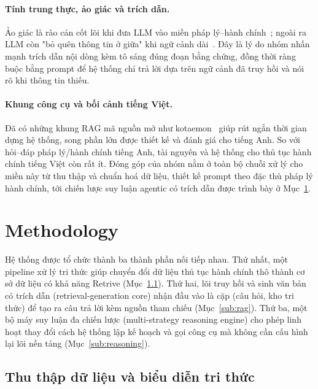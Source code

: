 \documentclass[11pt]{article}
\begin{document}
\paragraph{Tính trung thực, ảo giác và trích dẫn.}
Ảo giác là rào cản cốt lõi khi đưa LLM vào miền pháp lý--hành chính~\citep{ji2023hallucination};
ngoài ra LLM còn "bỏ quên thông tin ở giữa" khi ngữ cảnh dài~\citep{liu2024lostmiddle}. Đây
là lý do nhóm nhấn mạnh trích dẫn nội dòng kèm tô sáng đúng đoạn bằng chứng, đồng thời
ràng buộc bằng prompt để hệ thống chỉ trả lời dựa trên ngữ cảnh đã truy hồi và nói rõ khi
thông tin thiếu.

\paragraph{Khung công cụ và bối cảnh tiếng Việt.}
Đã có những khung RAG mã nguồn mở như kotaemon~\citep{kotaemon2024} giúp rút ngắn thời gian
dựng hệ thống, song phần lớn được thiết kế và đánh giá cho tiếng Anh. So với hỏi--đáp pháp
lý/hành chính tiếng Anh, tài nguyên và hệ thống cho thủ tục hành chính tiếng Việt còn
rất ít. Đóng góp của nhóm nằm ở toàn bộ chuỗi xử lý cho miền này   từ thu thập và
chuẩn hoá dữ liệu, thiết kế prompt theo đặc thù pháp lý hành chính, tới chiến lược suy luận
agentic có trích dẫn   được trình bày ở Mục~\ref{sec:method}.

\section{Methodology}
\label{sec:method}

Hệ thống được tổ chức thành ba thành phần nối tiếp nhau. Thứ nhất, một pipeline xử lý tri thức giúp chuyển đổi dữ liệu thủ tục hành chính thô thành cơ sở dữ liệu có khả năng Retrive (Mục~\ref{sub:data}). Thứ hai, lõi truy hồi và sinh văn bản có trích dẫn (retrieval-generation core) nhận đầu vào là cặp (câu hỏi, kho tri thức) để tạo ra câu trả lời kèm nguồn tham chiếu (Mục~\ref{sub:rag}). Thứ ba, một bộ máy suy luận đa chiến lược (multi-strategy reasoning engine) cho phép linh hoạt thay đổi cách hệ thống lập kế hoạch và gọi công cụ mà không cần cấu hình lại lõi nền tảng (Mục~\ref{sub:reasoning}).

               
\subsection{Thu thập dữ liệu và biểu diễn tri thức}
\label{sub:data}
\end{document}
